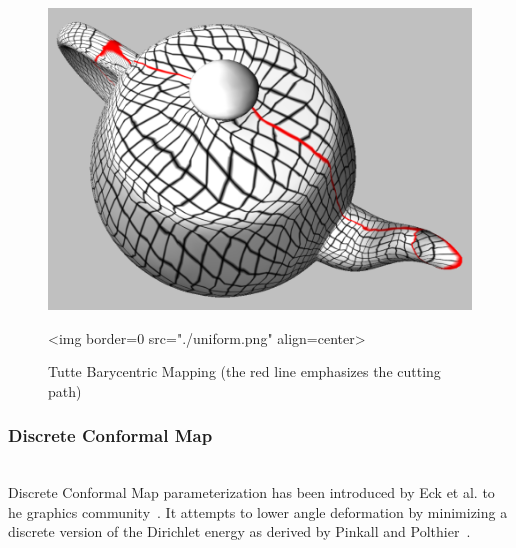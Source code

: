 \begin{figure}[bht]
    \begin{center}
        \begin{ccTexOnly}
            \includegraphics{Parameterization/uniform} %
        \end{ccTexOnly}
        \begin{ccHtmlOnly}
            <img border=0 src="./uniform.png" align=center>
        \end{ccHtmlOnly}
        \label{parameterization-fig-uniform}

        \caption{Tutte Barycentric Mapping (the red line emphasizes the cutting path)}
    \end{center}
\end{figure}


\subsubsection{Discrete Conformal Map}

  \\

Discrete Conformal Map parameterization has been introduced by Eck et
al. to he graphics community~\cite{cgal:fh-survey-05}. It attempts to
lower angle deformation by minimizing a discrete version of the
Dirichlet energy as derived by Pinkall and
Polthier~\cite{cgal:fh-survey-05}.


